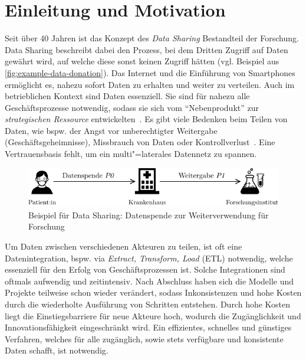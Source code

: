 
\section{Einleitung und Motivation}

Seit über 40 Jahren ist das Konzept des \emph{Data Sharing} Bestandteil der Forschung.
Data Sharing beschreibt dabei den Prozess, bei dem Dritten Zugriff auf Daten gewährt wird, auf welche diese sonst keinen Zugriff hätten (vgl. Beispiel aus \autoref{fig:example-data-donation}).
Das Internet und die Einführung von Smartphones ermöglicht es, nahezu sofort Daten zu erhalten und weiter zu verteilen.
Auch im betrieblichen Kontext sind Daten essenziell.
Sie sind für nahezu alle Geschäftsprozesse notwendig, sodass sie sich vom \enquote{Nebenprodukt} zur \emph{strategischen Ressource} entwickelten~\cite{mollerIndustrialDataEcosystems2024}.
Es gibt viele Bedenken beim Teilen von Daten, wie bspw. der Angst vor unberechtigter Weitergabe (Geschäftsgeheimnisse), Missbrauch von Daten oder Kontrollverlust~\cite{mollerIndustrialDataEcosystems2024}.
Eine Vertrauensbasis fehlt, um ein multi"=laterales Datennetz zu spannen.

\begin{figure}
    \includegraphics[width=\textwidth]{./assets/example_horizontal.drawio.pdf}
    \caption{Beispiel für Data Sharing: Datenspende zur Weiterverwendung für Forschung}
    \label{fig:example-data-donation}
\end{figure}

Um Daten zwischen verschiedenen Akteuren zu teilen, ist oft eine Datenintegration, bspw. via \emph{Extract, Transform, Load} (ETL) notwendig, welche essenziell für den Erfolg von Geschäftsprozessen ist.
Solche Integrationen sind oftmals aufwendig und zeitintensiv.
Nach Abschluss haben sich die Modelle und Projekte teilweise schon wieder verändert, sodass Inkonsistenzen und hohe Kosten durch die wiederholte Ausführung von Schritten entstehen.
Durch hohe Kosten liegt die Einstiegsbarriere für neue Akteure hoch, wodurch die Zugänglichkeit und Innovationsfähigkeit eingeschränkt wird.
Ein effizientes, schnelles und günstiges Verfahren, welches für alle zugänglich, sowie stets verfügbare und konsistente Daten schafft, ist notwendig.


